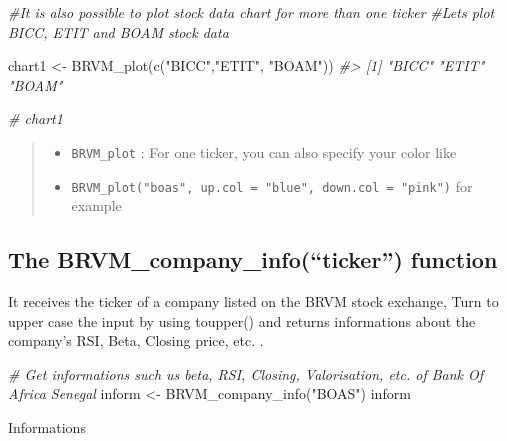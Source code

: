 \documentclass[
]{article}
\newenvironment{Shaded}{\begin{snugshade}}{\end{snugshade}}
\newcommand{\CommentTok}[1]{\textcolor[rgb]{0.56,0.35,0.01}{\textit{#1}}}
\newcommand{\FunctionTok}[1]{\textcolor[rgb]{0.00,0.00,0.00}{#1}}
\newcommand{\NormalTok}[1]{#1}
\newcommand{\OtherTok}[1]{\textcolor[rgb]{0.56,0.35,0.01}{#1}}
\newcommand{\StringTok}[1]{\textcolor[rgb]{0.31,0.60,0.02}{#1}}
\providecommand{\tightlist}{%
  \setlength{\itemsep}{0pt}\setlength{\parskip}{0pt}}
\begin{document}
\begin{Shaded}
\begin{Highlighting}[]
\CommentTok{\#It is also possible to plot stock data chart for more than one ticker}
\CommentTok{\#Let\textquotesingle{}s plot BICC, ETIT and BOAM stock data}

\NormalTok{chart1 }\OtherTok{\textless{}{-}} \FunctionTok{BRVM\_plot}\NormalTok{(}\FunctionTok{c}\NormalTok{(}\StringTok{"BICC"}\NormalTok{,}\StringTok{"ETIT"}\NormalTok{, }\StringTok{"BOAM"}\NormalTok{))}
\CommentTok{\#\textgreater{} [1] "BICC" "ETIT" "BOAM"}

\CommentTok{\# chart1}
\end{Highlighting}
\end{Shaded}

\begin{quote}
\begin{itemize}
\tightlist
\item
  \texttt{BRVM\_plot} : For one ticker, you can also specify your color
  like
\item
  \texttt{BRVM\_plot("boas",\ up.col\ =\ "blue",\ down.col\ =\ "pink")}
  for example
\end{itemize}
\end{quote}

\hypertarget{the-brvm_company_infoticker-function}{%
\subsection{\texorpdfstring{The \textbf{BRVM\_company\_info(``ticker'')}
function}{The BRVM\_company\_info(``ticker'') function}}\label{the-brvm_company_infoticker-function}}

It receives the ticker of a company listed on the BRVM stock exchange,
Turn to upper case the input by using toupper() and returns informations
about the company's RSI, Beta, Closing price, etc. .

\begin{Shaded}
\begin{Highlighting}[]

\CommentTok{\# Get informations such us beta, RSI, Closing, Valorisation, etc. of Bank Of Africa Senegal}
\NormalTok{inform }\OtherTok{\textless{}{-}} \FunctionTok{BRVM\_company\_info}\NormalTok{(}\StringTok{"BOAS"}\NormalTok{)}
\NormalTok{inform}
\end{Highlighting}
\end{Shaded}

Informations
\end{document}
